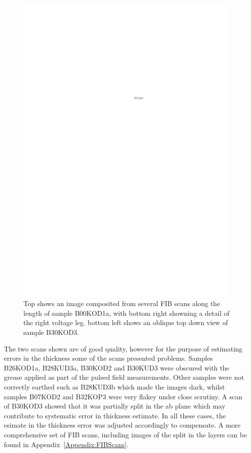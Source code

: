 \begin{figure}[htbp]
	\begin{center}
		\includegraphics[scale=0.9]{CHapter-HallBSCO/FIgures/FIBExamples/FIBExamples}
		\caption{Top shows an image composited from several \ac{FIB} scans along the length of sample B00KOD1a, with bottom right showning a detail of the right voltage leg.  bottom left shows an oblique top down view of sample B30KOD3.}
		\label{Fig:ExpH:FIBExamples}
	\end{center}
\end{figure}

The two scans shown are of good quality, however for the purpose of estimating errors in the thickness some of the scans presented problems. Samples B26KOD1a, B28KUD3a, B30KOD2 and B30KUD3 were obscured with the grease applied as part of the pulsed field measurements. Other samples were not correctly earthed such as B28KUD3b which made the images dark, whilst samples B07KOD2 and B32KOP3 were very flakey under close scrutiny. A scan of B30KOD3 showed that it was partially split in the ab plane which may contribute to systematic error in thickness estimate. In all these cases, the esimate in the thickness error was adjusted accordingly to compensate. A more comprehensive set of \ac{FIB} scans, including images of the split in the layers can be found in Appendix~\ref{Appendix:FIBScans}.

